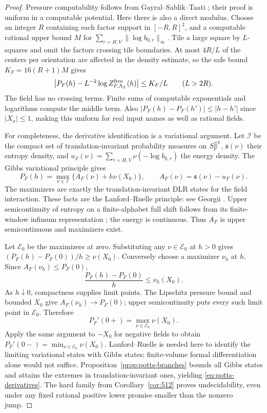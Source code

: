 \begin{proof}
Pressure computability follows from Gayral--Sablik--Taati \cite[Proposition 14]{GST}; their proof is uniform in a computable potential. Here there is also a direct modulus. Choose an integer $R$ containing each factor support in $[-R,R]^2$, and a computable rational upper bound $M$ for $\sum_{r=H,V}\|\log b_{0,r}\|_\infty$. Tile a large square by $L$-squares and omit the factors crossing tile boundaries. At most $4R/L$ of the centers per orientation are affected in the density estimate, so the safe bound $K_F=16(R+1)M$ gives
\[
 \left|P_F(h)-L^{-2}\log Z^{\rm free}_{F,\Lambda_L}(h)\right|
 \le K_F/L\qquad(L>2R).
\]
The field has no crossing terms. Finite sums of computable exponentials and logarithms compute the middle term. Also $|P_F(h)-P_F(h')|\le|h-h'|$ since $|X_x|\le1$, making this uniform for real input names as well as rational fields.

For completeness, the derivative identification is a variational argument. Let $\mathcal I$ be the compact set of translation-invariant probability measures on $S_{\rm P}^{\mathbb Z^2}$, $\mathfrak s(\nu)$ their entropy density, and
$u_F(\nu)=\sum_{r=H,V}\nu(-\log b_{0,r})$ the energy density. The Gibbs variational principle gives
\begin{equation}\label{eq:potts-variational}
 P_F(h)=\max_{\nu\in\mathcal I}
 \{A_F(\nu)+h\nu(X_0)\},\qquad
 A_F(\nu)=\mathfrak s(\nu)-u_F(\nu).
\end{equation}
The maximizers are exactly the translation-invariant DLR states for the field interaction. These facts are the Lanford--Ruelle principle: see Georgii \cite[Theorems 15.30 and 15.39, with the converse in Theorem 15.37]{Georgii}. Upper semicontinuity of entropy on a finite-alphabet full shift follows from its finite-window infimum representation \cite[Theorem 15.12 and Proposition 15.14]{Georgii}; the energy is continuous. Thus $A_F$ is upper semicontinuous and maximizers exist.

Let $\mathcal E_0$ be the maximizers at zero. Substituting any $\nu\in\mathcal E_0$ at $h>0$ gives
$(P_F(h)-P_F(0))/h\ge\nu(X_0)$.
Conversely choose a maximizer $\nu_h$ at $h$. Since $A_F(\nu_h)\le P_F(0)$,
\[
 \frac{P_F(h)-P_F(0)}h\le\nu_h(X_0).
\]
As $h\downarrow0$, compactness supplies limit points. The Lipschitz pressure bound and bounded $X_0$ give $A_F(\nu_h)\to P_F(0)$; upper semicontinuity puts every such limit point in $\mathcal E_0$. Therefore
\[
 P_F'(0+)=\max_{\nu\in\mathcal E_0}\nu(X_0).
\]
Apply the same argument to $-X_0$ for negative fields to obtain
$P_F'(0-)=\min_{\nu\in\mathcal E_0}\nu(X_0)$.
Lanford--Ruelle is needed here to identify the limiting variational states with Gibbs states; finite-volume formal differentiation alone would not suffice. Proposition~\ref{prop:potts-branches} bounds all Gibbs states and attains the extremes in translation-invariant ones, yielding \eqref{eq:potts-derivatives}. The hard family from Corollary~\ref{cor:512} proves undecidability, even under any fixed rational positive lower promise smaller than the nonzero jump.
\end{proof}

